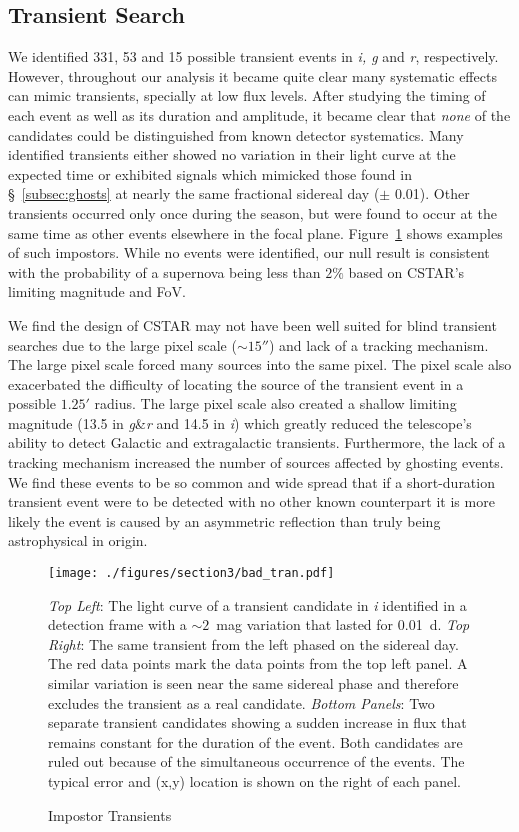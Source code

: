 \subsection{Transient Search}
We identified 331, 53 and 15 possible transient events in \textit{i, g} and \textit{r}, respectively. However, throughout our analysis it became quite clear many systematic effects can mimic transients, specially at low flux levels. After studying the timing of each event as well as its duration and amplitude, it became clear that \textit{none} of the candidates could be distinguished from known detector systematics. Many identified transients either showed no variation in their light curve at the expected time or exhibited signals which mimicked those found in \S~\ref{subsec:ghosts} at nearly the same fractional sidereal day ($\pm$ 0.01). Other transients occurred only once during the season, but were found to occur at the same time as other events elsewhere in the focal plane. Figure~\ref{fig:bdtran} shows examples of such impostors. While no events were identified, our null result is consistent with the probability of a supernova being less than $2\%$ based on CSTAR's limiting magnitude and FoV.

We find the design of CSTAR may not have been well suited for blind transient searches due to the large pixel scale ($\sim15''$) and lack of a tracking mechanism. The large pixel scale forced many sources into the same pixel. The pixel scale also exacerbated the difficulty of locating the source of the transient event in a possible $1.25'$ radius. The large pixel scale also created a shallow limiting magnitude (13.5 in \textit{g}\&\textit{r} and 14.5 in \textit{i}) which greatly reduced the telescope's ability to detect Galactic and extragalactic transients. Furthermore, the lack of a tracking mechanism increased the number of sources affected by ghosting events. We find these events to be so common and wide spread that if a short-duration transient event were to be detected with no other known counterpart it is more likely the event is caused by an asymmetric reflection than truly being astrophysical in origin. 

\begin{figure}[H]
\begin{center}
\singlespace
\texttt{[image: ./figures/section3/bad\_tran.pdf]}
\end{center}
\singlespace
\caption{Impostor Transients}   \textit{Top Left}: The light curve of a transient candidate in \textit{i} identified in a detection frame with a $\sim 2$~mag variation that lasted for 0.01~d. \textit{Top Right}: The same transient from the left phased on the sidereal day. The red data points mark the data points from the top left panel. A similar variation is seen near the same sidereal phase and therefore excludes the transient as a real candidate. \textit{Bottom Panels}: Two separate transient candidates showing a sudden increase in flux that remains constant for the duration of the event. Both candidates are ruled out because of the simultaneous occurrence of the events. The typical error and (x,y) location is shown on the right of each panel.\label{fig:bdtran}
\end{figure}

